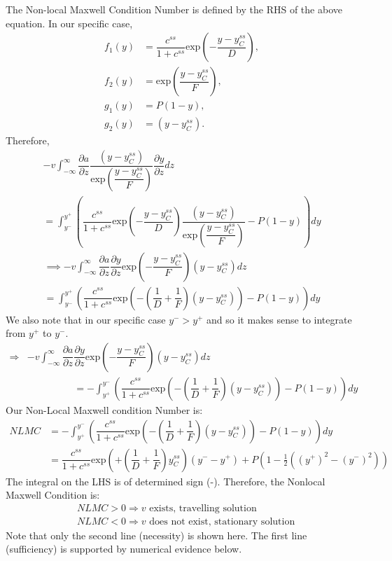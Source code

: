 The Non-local Maxwell Condition Number is defined by the RHS of the above equation. In our specific case,
\begin{align}
f_1(y) &=  \dfrac{c^{ss}}{1+c^{ss}} \mbox{exp}\left(-\dfrac{y-y_C^{ss}}{D}\right),\\
f_2(y) &= \mbox{exp} \left(\dfrac{y-y_C^{ss}}{F} \right),\\
g_1(y) &=  P (1-y), \\
 g_2(y) &= (y - y_C^{ss}).
\end{align}
Therefore, 
\begin{multline}
-v  \int_ {- \infty}^{\infty}  \dfrac{\partial a}{ \partial z} \dfrac{(y - y_C^{ss})}{ \mbox{exp} \left(\dfrac{y-y_C^{ss}}{F} \right)} \dfrac{\partial y}{\partial z} dz \\
= \int_ {y^{-}}^{y^{+}} \left( \dfrac{c^{ss}}{1+c^{ss}} \mbox{exp}\left(-\dfrac{y-y_C^{ss}}{D}\right) \dfrac{(y - y_C^{ss})}{ \mbox{exp} \left(\dfrac{y-y_C^{ss}}{F} \right)}  -   P (1-y) \right) dy
\end{multline}
\begin{multline}
\implies -v  \int_ {- \infty}^{\infty}  \dfrac{\partial a}{ \partial z}\dfrac{\partial y}{\partial z} \mbox{exp} \left(-\dfrac{y-y_C^{ss}}{F} \right)(y - y_C^{ss}) dz \\
= \int_ {y^{-}}^{y^{+}}  \left( \dfrac{c^{ss}}{1+c^{ss}} \mbox{exp}\left( -\left( \dfrac{1}{D} + \dfrac{1}{F} \right) (y-y_C^{ss})\right)  -   P (1-y) \right) dy
\end{multline}
We also note that in our specific case $y^- > y^+$ and so it makes sense to integrate from $y^+$ to $ y^-$.
\begin{align*}
\Rightarrow & -v  \int_ {- \infty}^{\infty}  \dfrac{\partial a}{ \partial z}\dfrac{\partial y}{\partial z} \mbox{exp} \left(-\dfrac{y-y_C^{ss}}{F} \right)(y - y_C^{ss}) dz\\
& \hspace{2cm}= - \int_ {y^{+}}^{y^{-}}  \left( \dfrac{c^{ss}}{1+c^{ss}} \mbox{exp}\left( -\left( \dfrac{1}{D} + \dfrac{1}{F} \right) (y-y_C^{ss})\right)  -   P (1-y) \right) dy
\end{align*}
Our Non-Local Maxwell condition Number is:
\begin{align}
NLMC &= -\int_ {y^{+}}^{y^{-}}  \left( \dfrac{c^{ss}}{1+c^{ss}} \mbox{exp}\left( -\left( \dfrac{1}{D} + \dfrac{1}{F} \right) (y-y_C^{ss})\right)  -   P (1-y) \right) dy \\
 &= \dfrac{c^{ss}}{1+c^{ss}}  \mbox{exp}\left( +\left( \dfrac{1}{D} + \dfrac{1}{F} \right)y_C^{ss}  \right) \left( y^--y^+ \right) + P\left( 1 - \frac{1}{2}\left( \left(y^+\right)^2-\left(y^-\right)^2\right)\right)
\end{align}
The integral on the LHS is of determined sign (-).  Therefore, the Nonlocal Maxwell Condition is:
\begin{align*}
& NLMC >0 \Rightarrow v \text{ exists, travelling solution}\\
& NLMC <0 \Rightarrow v \text{ does not exist, stationary solution}
\end{align*}
Note that only the second line (necessity) is shown here. The first line (sufficiency) is supported by numerical evidence below.

